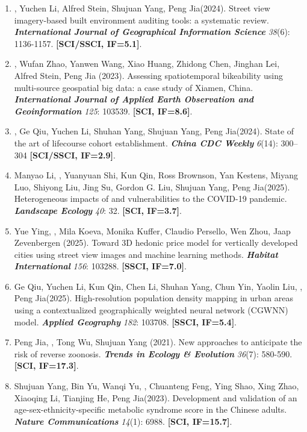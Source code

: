 \begin{enumerate}
\item
    \Shaoqing, Yuchen Li, Alfred Stein, Shujuan Yang, Peng Jia\CS (2024).
    Street view imagery-based built environment auditing tools: a systematic review. 
    \textbf{\textit{International Journal of Geographical Information Science}} \textit{38}(6): 1136-1157.
    \textbf{[SCI/SSCI, IF=5.1]}.
\item
    \Shaoqing, Wufan Zhao\CS, Yanwen Wang, Xiao Huang, Zhidong Chen, Jinghan Lei, Alfred Stein, Peng Jia (2023).
    Assessing spatiotemporal bikeability using multi-source geospatial big data: a case study of Xiamen, China. 
    \textbf{\textit{International Journal of Applied Earth Observation and Geoinformation}} \textit{125}: 103539.
    \textbf{[SCI, IF=8.6]}.
\item
    \Shaoqing, Ge Qiu, Yuchen Li, Shuhan Yang, Shujuan Yang, Peng Jia\CS (2024).
    State of the art of lifecourse cohort establishment. 
    \textbf{\textit{China CDC Weekly}} \textit{6}(14): 300–304 
    \textbf{[SCI/SSCI, IF=2.9]}.
\item    
    Manyao Li\CF, \Shaoqing\CF, Yuanyuan Shi\CF, Kun Qin\CF, Ross Brownson, Yan Kestens, Miyang Luo, Shiyong Liu, Jing Su, Gordon G. Liu, Shujuan Yang\CS, Peng Jia\CS (2025).
    Heterogeneous impacts of and vulnerabilities to the COVID-19 pandemic. 
    \textbf{\textit{Landscape Ecology}} \textit{40}: 32.
    \textbf{[SCI, IF=3.7]}.
\item    
    Yue Ying, \Shaoqing\CS, Mila Koeva, Monika Kuffer, Claudio Persello, Wen Zhou, Jaap Zevenbergen (2025).
    Toward 3D hedonic price model for vertically developed cities using street view images and machine learning methods. 
    \textbf{\textit{Habitat International}} \textit{156}: 103288.
    \textbf{[SSCI, IF=7.0]}.
\item    
    Ge Qiu, Yuchen Li, Kun Qin, Chen Li, Shuhan Yang, Chun Yin, Yaolin Liu\CS, \Shaoqing\CS, Peng Jia\CS (2025).
    High-resolution population density mapping in urban areas using a contextualized geographically weighted neural network (CGWNN) model. 
    \textbf{\textit{Applied Geography}} \textit{182}: 103708.
    \textbf{[SSCI, IF=5.4]}.
\item
    Peng Jia\CS, \Shaoqing, Tong Wu, Shujuan Yang (2021).
    New approaches to anticipate the risk of reverse zoonosis.
    \textbf{\textit{Trends in Ecology \& Evolution}} \textit{36}(7): 580-590.
    \textbf{[SCI, IF=17.3]}.
\item
    Shujuan Yang, Bin Yu, Wanqi Yu, \Shaoqing, Chuanteng Feng, Ying Shao, Xing Zhao, Xiaoqing Li, Tianjing He, Peng Jia\CS (2023).
    Development and validation of an age-sex-ethnicity-specific metabolic syndrome score in the Chinese adults.
    \textbf{\textit{Nature Communications}} \textit{14}(1): 6988.
    \textbf{[SCI, IF=15.7]}.
\end{enumerate}

